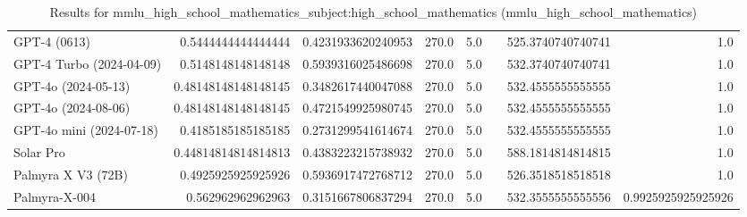 \begin{table}[htp]
{\begin{tabular}{lrrrrrrr}
GPT-4 (0613) & 0.5444444444444444 & 0.4231933620240953 & 270.0 & 5.0 &  & 525.3740740740741 & 1.0 \\
GPT-4 Turbo (2024-04-09) & 0.5148148148148148 & 0.5939316025486698 & 270.0 & 5.0 &  & 532.3740740740741 & 1.0 \\
GPT-4o (2024-05-13) & 0.48148148148148145 & 0.3482617440047088 & 270.0 & 5.0 &  & 532.4555555555555 & 1.0 \\
GPT-4o (2024-08-06) & 0.48148148148148145 & 0.4721549925980745 & 270.0 & 5.0 &  & 532.4555555555555 & 1.0 \\
GPT-4o mini (2024-07-18) & 0.4185185185185185 & 0.2731299541614674 & 270.0 & 5.0 &  & 532.4555555555555 & 1.0 \\
Solar Pro & 0.44814814814814813 & 0.4383223215738932 & 270.0 & 5.0 &  & 588.1814814814815 & 1.0 \\
Palmyra X V3 (72B) & 0.4925925925925926 & 0.5936917472768712 & 270.0 & 5.0 &  & 526.3518518518518 & 1.0 \\
Palmyra-X-004 & 0.562962962962963 & 0.3151667806837294 & 270.0 & 5.0 &  & 532.3555555555556 & 0.9925925925925926 \\
\bottomrule
\end{tabular}}
\caption{Results for mmlu_high_school_mathematics_subject:high_school_mathematics (mmlu_high_school_mathematics)}
\label{fig:mmlu_high_school_mathematics_subject:high_school_mathematics (mmlu_high_school_mathematics)}
\end{table}